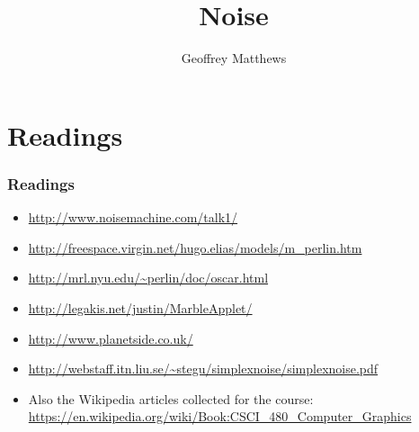 \documentclass[slidestop,xcolor=pst]{beamer}
\title[Computer Graphics, CSCI 480]
{
Noise
}
\subtitle{} %
\author[Geoffrey Matthews]
{Geoffrey Matthews}
\institute[WWU/CS]
{
  Department of Computer Science\\
  Western Washington University
}
\newcommand{\sect}[1]{
\section{#1}
\begin{frame}[fragile]\frametitle{#1}
}
\begin{document}

\begin{frame}
  \titlepage
\end{frame}


\newcommand{\myref}[1]{\small\item\url{#1}}
\newcommand{\myreft}[1]{\footnotesize\item\url{#1}}


\sect{Readings}

\begin{itemize}
\myref{http://www.noisemachine.com/talk1/}
\myref{http://freespace.virgin.net/hugo.elias/models/m_perlin.htm}
\myref{http://mrl.nyu.edu/~perlin/doc/oscar.html}
\myref{http://legakis.net/justin/MarbleApplet/}
\myref{http://www.planetside.co.uk/}
\myreft{http://webstaff.itn.liu.se/~stegu/simplexnoise/simplexnoise.pdf}
\item Also the Wikipedia articles collected for the course:
\url{https://en.wikipedia.org/wiki/Book:CSCI_480_Computer_Graphics}
\end{itemize}

\end{frame}
\end{document}
